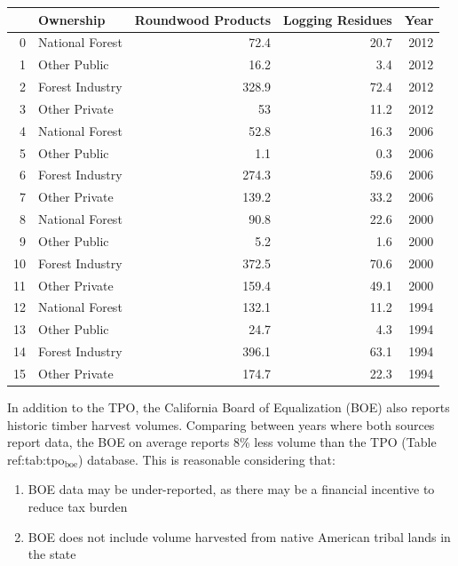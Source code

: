 \documentclass[a4paper]{article}
\begin{document}
\begin{center}
\begin{tabular}{rlrrr}
 & Ownership & Roundwood Products & Logging Residues & Year\\
\hline
0 & National Forest & 72.4 & 20.7 & 2012\\
1 & Other Public & 16.2 & 3.4 & 2012\\
2 & Forest Industry & 328.9 & 72.4 & 2012\\
3 & Other Private & 53 & 11.2 & 2012\\
4 & National Forest & 52.8 & 16.3 & 2006\\
5 & Other Public & 1.1 & 0.3 & 2006\\
6 & Forest Industry & 274.3 & 59.6 & 2006\\
7 & Other Private & 139.2 & 33.2 & 2006\\
8 & National Forest & 90.8 & 22.6 & 2000\\
9 & Other Public & 5.2 & 1.6 & 2000\\
10 & Forest Industry & 372.5 & 70.6 & 2000\\
11 & Other Private & 159.4 & 49.1 & 2000\\
12 & National Forest & 132.1 & 11.2 & 1994\\
13 & Other Public & 24.7 & 4.3 & 1994\\
14 & Forest Industry & 396.1 & 63.1 & 1994\\
15 & Other Private & 174.7 & 22.3 & 1994\\
\end{tabular}
\end{center}


In addition to the TPO, the California Board of Equalization (BOE) also
reports historic timber harvest volumes.  Comparing between years where both
sources report data, the BOE on average reports 8\% less volume than the TPO (Table ref:tab:tpo$_{\text{boe}}$) database. This is reasonable considering that:
\begin{enumerate}
\item BOE data may be under-reported, as there may be a financial incentive to reduce tax burden
\item BOE does not include volume harvested from native American tribal lands in the state
\end{enumerate}
\end{document}

